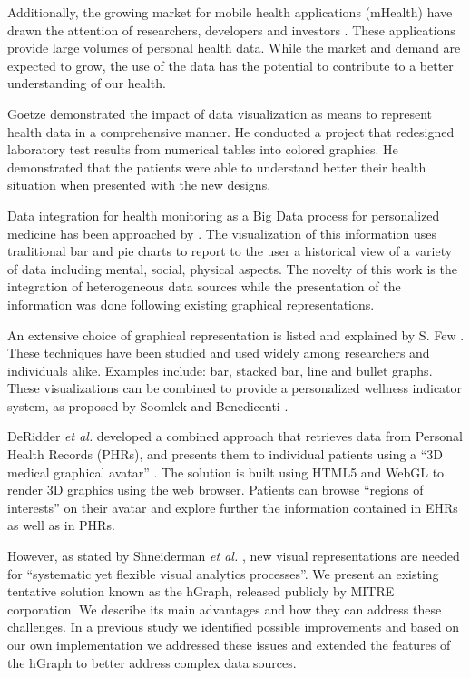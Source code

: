 \documentclass[twocolumn]{bmcart}%
\begin{document}
Additionally, the growing market for mobile health applications (mHealth) have drawn the attention of researchers, developers and investors \cite{mHealth2014}. These applications provide large volumes of personal health data. While the market and demand are expected to grow, the use of the data has the potential to contribute to a better understanding of our health.

Goetze \cite{goetz2015} demonstrated the impact of data visualization as means to represent health data in a comprehensive manner. He conducted a project that redesigned laboratory test results from numerical tables into colored graphics. He demonstrated that the patients were able to understand better their health situation when presented with the new designs.

Data integration for health monitoring as a Big Data process for personalized medicine has been approached by \cite{7072838}. The visualization of this information uses traditional bar and pie charts to report to the user a historical view of a variety of data including mental, social, physical aspects. The novelty of this work is the integration of heterogeneous data sources while the presentation of the information was done following existing graphical representations.

An extensive choice of graphical representation is listed and explained by S. Few \cite{few2006information}. These techniques have been studied and used widely among researchers and individuals alike. Examples include: bar, stacked bar, line and bullet graphs. These visualizations can be combined to provide a personalized wellness indicator system, as proposed by Soomlek and Benedicenti \cite{Soomlek:2013:AWI:2532685.2532686}.

DeRidder \textit{et al.} developed a combined approach that retrieves data from Personal Health Records (PHRs), and presents them to individual patients using a ``3D medical graphical avatar'' \cite{de2013web}. The solution is built using HTML5 and WebGL to render 3D graphics using the web browser. Patients can browse ``regions of interests'' on their avatar and explore further the information contained in EHRs as well as in PHRs.

However, as stated by Shneiderman \textit{et al.} \cite{shneiderman2013improving}, new visual representations are needed for ``systematic yet flexible visual analytics processes''. We present an existing tentative solution known as the hGraph, released publicly by MITRE corporation. We describe its main advantages and how they can address these challenges. In a previous study we identified possible improvements and based on our own implementation we addressed these issues and extended the features of the hGraph to better address complex data sources.
\end{document}
